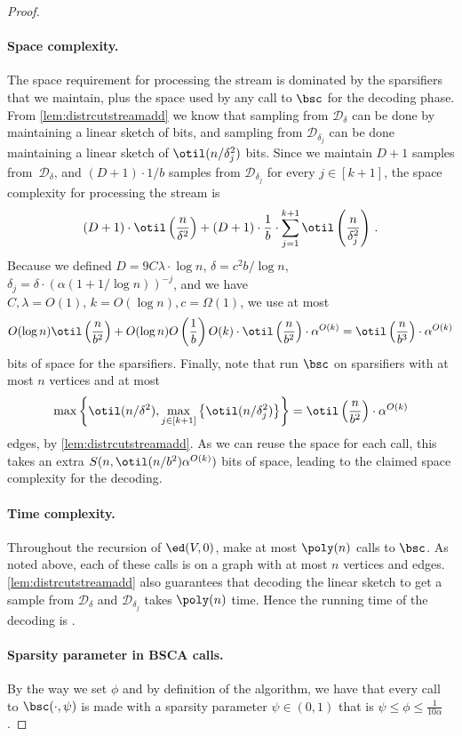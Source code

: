 \begin{proof}
	\paragraph{Space complexity.} The space requirement for processing the stream is dominated by the sparsifiers that we maintain, plus the space used by any call to $\bsc$ for the decoding phase. From \cref{lem:distrcutstreamadd} we know that sampling from $\mathcal{D}_{\delta}$ can be done by maintaining a linear sketch of  bits, and sampling from $\mathcal{D}_{\delta_j}$ can be done maintaining a linear sketch of $\otil(n/\delta_j^2)$ bits.  Since we maintain $D+1$ samples from~$\mathcal{D}_\delta$, and $(D+1) \cdot 1/b$ samples from $\mathcal{D}_{\delta_j}$ for every $j \in [k+1]$, the space complexity for processing the stream is
	\begin{equation*}
		(D+1) \cdot \otil\left(\frac{n}{\delta^2}\right) + (D+1) \cdot \frac{1}{b}\cdot \sum_{j=1}^{k+1} \otil\left(\frac{n}{\delta_j^2}\right) \, .
	\end{equation*}
	Because we defined $D=9C\lambda \cdot \log n$, $\delta=c^2b/\log n$, $\delta_j=\delta \cdot (\alpha(1+1/\log n))^{-j}$, and we have $C,\lambda = O(1),\,k = O(\log n), c = \Omega(1)$, we use at most
	\begin{equation*}
		O(\log n) \otil\left(\frac{n}{b^2}\right) + O(\log n)  O\left(\frac{1}{b}\right)O(k) \cdot \otil\left(\frac{n}{b^2}\right) \cdot \alpha^{O(k)} = \otil\left(\frac{n}{b^3}\right) \cdot \alpha^{O(k)}
	\end{equation*}
	bits of space for the sparsifiers. Finally, note that  run $\bsc$ on sparsifiers with at most $n$ vertices and at most
	\begin{equation*}
		\max\left\{\otil(n/\delta^2),\max_{j \in [k+1]}\left\{\otil(n/\delta_{j}^2)\right\}\right\} =  \otil\left(\frac{n}{b^2}\right) \cdot \alpha^{O(k)}
	\end{equation*}
	edges, by \cref{lem:distrcutstreamadd}. As we can reuse the space for each call, this takes an extra $S(n,\otil(n/b^2)\alpha^{O(k)})$ bits of space, leading to the claimed space complexity for the decoding.
	
	\paragraph{Time complexity.}
	Throughout the recursion of $\ed(V,0)$,   make at most $\poly(n)$ calls to $\bsc$. As noted above, each of these calls is on a graph with at most $n$ vertices and  edges. \cref{lem:distrcutstreamadd} also guarantees that decoding the linear sketch to get a sample from $\mathcal{D}_\delta$ and $\mathcal{D}_{\delta_j}$ takes $\poly(n)$ time. Hence the running time of the decoding is .
	
	\paragraph{Sparsity parameter in BSCA calls.} By the way we set $\phi$ and by definition of the algorithm, we have that every call to $\bsc(\cdot, \psi)$ is made with a sparsity parameter $\psi \in (0,1)$ that is $\psi \le \phi \le \frac{1}{10\alpha}$.
	
\end{proof}